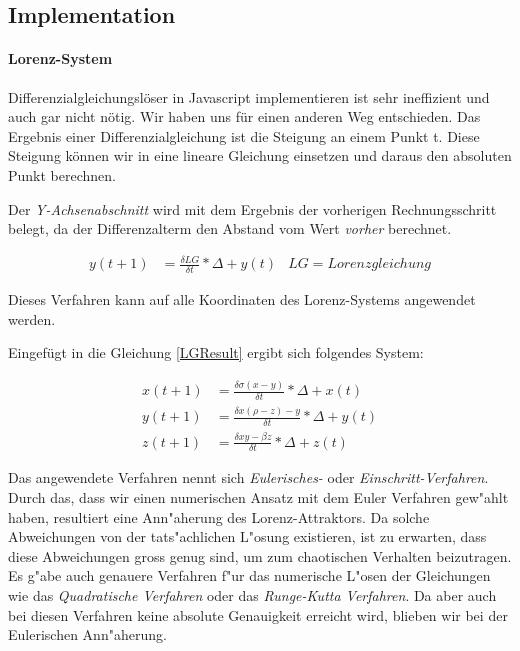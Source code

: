 \documentclass[implementation]{subfiles}
\begin{document}
	\subsection{Implementation}
	
	\paragraph{Lorenz-System}
	Differenzialgleichungslöser in Javascript implementieren ist sehr ineffizient und auch gar nicht nötig. Wir haben uns für einen anderen Weg entschieden. Das Ergebnis einer Differenzialgleichung ist die Steigung an einem Punkt t. Diese Steigung können wir in eine lineare Gleichung einsetzen und daraus den absoluten Punkt berechnen.
	
	Der \textit{Y-Achsenabschnitt} wird mit dem Ergebnis der vorherigen Rechnungsschritt belegt, da der Differenzalterm den Abstand vom Wert \textit{vorher} berechnet.  
	
	\begin{align}
		\label{LGResult}
		y(t + 1) &= \frac{\delta LG}{\delta t} * \Delta + y(t) & LG = Lorenzgleichung
	\end{align}
	
	Dieses Verfahren kann auf alle Koordinaten des Lorenz-Systems angewendet werden.

	Eingefügt in die Gleichung \eqref{LGResult} ergibt sich folgendes System:
	
	\begin{centerFigure}
		\begin{align}
			x(t + 1) &= \frac{\delta \sigma(x - y)}{\delta t} * \Delta + x(t)\\
			y(t + 1) &= \frac{\delta x(\rho - z) - y}{\delta t} * \Delta + y(t)\\
			z(t + 1) &= \frac{\delta xy - \beta z}{\delta t} * \Delta + z(t)
		\end{align}
	\end{centerFigure}
	Das angewendete Verfahren nennt sich \textit{Eulerisches-} oder \textit{Einschritt-Verfahren}. Durch das, dass wir einen numerischen Ansatz mit dem Euler Verfahren gew"ahlt haben, resultiert eine Ann"aherung des Lorenz-Attraktors. Da solche Abweichungen von der tats"achlichen L"osung existieren, ist zu erwarten, dass diese Abweichungen gross genug sind, um zum chaotischen Verhalten beizutragen. Es g"abe auch genauere Verfahren f"ur das numerische L"osen der Gleichungen wie das \textit{Quadratische Verfahren} oder das \textit{Runge-Kutta Verfahren}. Da aber auch bei diesen Verfahren keine absolute Genauigkeit erreicht wird, blieben wir bei der Eulerischen Ann"aherung. \\
	
\end{document}
